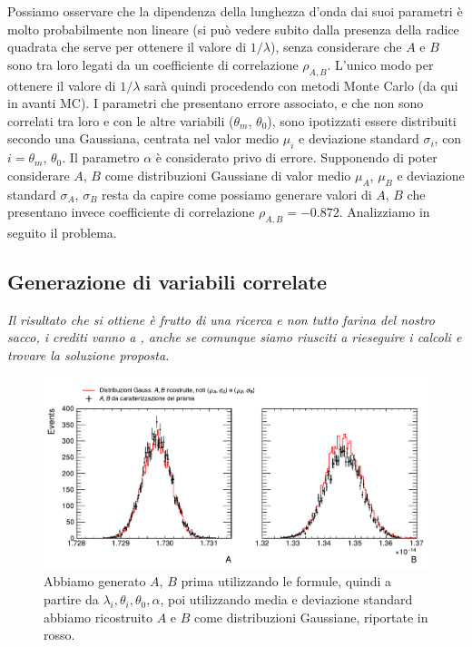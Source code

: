 \documentclass[a4paper,aps,12pt,tightenlines]{revtex4-2}
\begin{document}
Possiamo osservare che la dipendenza della lunghezza d'onda dai suoi parametri è molto probabilmente non lineare (si può vedere subito dalla presenza della radice quadrata che serve per ottenere il valore di $1/\lambda$), senza considerare che $A$ e $B$ sono tra loro legati da un coefficiente di correlazione $\rho_{A,B}$. L'unico modo per ottenere il valore di $1/\lambda$ sarà quindi procedendo con metodi Monte Carlo (da qui in avanti MC). I parametri che presentano errore associato, e che non sono correlati tra loro e con le altre variabili ($\theta_m$, $\theta_0$), sono ipotizzati essere distribuiti secondo una Gaussiana, centrata nel valor medio $\mu_i$ e deviazione standard $\sigma_i$, con $i=\theta_m$, $\theta_0$. Il parametro $\alpha$ è considerato privo di errore. Supponendo di poter considerare $A$, $B$ come distribuzioni Gaussiane di valor medio $\mu_A$, $\mu_B$ e deviazione standard $\sigma_A$, $\sigma_B$ resta da capire come possiamo generare valori di $A$, $B$ che presentano invece coefficiente di correlazione $\rho_{A,B} = \num{-0.872}$. Analizziamo in seguito il problema.

\subsection{Generazione di variabili correlate}
\emph{Il risultato che si ottiene è frutto di una ricerca e non tutto farina del nostro sacco, i crediti vanno a \cite{anthonyAnswerHowDoes2015, sobolevAnswerHowDoes2015, kaiserSamplePopulationScore1962}, anche se comunque siamo riusciti a rieseguire i calcoli e trovare la soluzione proposta. }

\begin{figure}
\centering
\includegraphics[width=15cm]{../figures_and_tests/gaus_compAB.pdf}
\caption{Abbiamo generato $A$, $B$ prima utilizzando le formule, quindi a partire da $\lambda_i, \theta_i, \theta_0, \alpha$, poi utilizzando media e deviazione standard abbiamo ricostruito $A$ e $B$ come distribuzioni Gaussiane, riportate in rosso.\label{fig:A_B_gaus}}
\end{figure}
\end{document}
